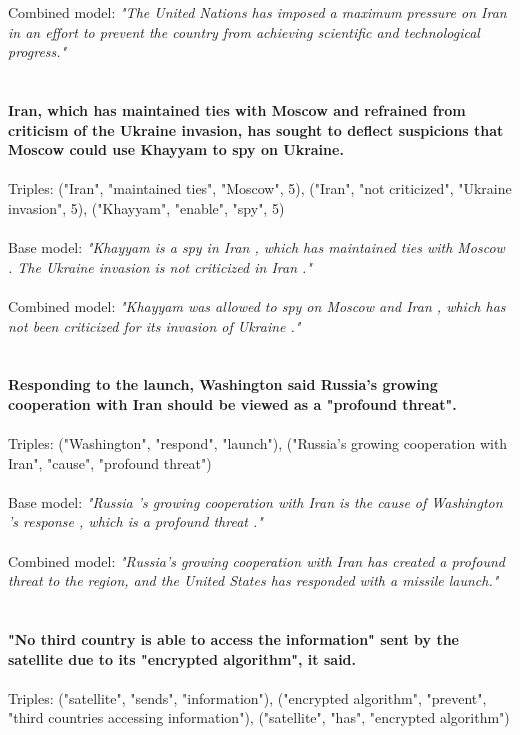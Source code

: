 \documentclass[
hf, %
]{ceurart}
\begin{document}
\noindent
Combined model: \textit{"The United Nations has imposed a maximum pressure on Iran in an effort to prevent the country from achieving scientific and technological progress."}\\\\\\
\noindent
\textbf{Iran, which has maintained ties with Moscow and refrained from criticism of the Ukraine invasion, has sought to deflect suspicions that Moscow could use Khayyam to spy on Ukraine.}\\\\
\noindent
Triples: ("Iran", "maintained ties", "Moscow", 5), ("Iran", "not criticized", "Ukraine invasion", 5), ("Khayyam", "enable", "spy", 5)\\\\
\noindent
Base model: \textit{"Khayyam is a spy in Iran , which has maintained ties with Moscow . The Ukraine invasion is not criticized in Iran ."}\\\\
\noindent
Combined model: \textit{"Khayyam was allowed to spy on Moscow and Iran , which has not been criticized for its invasion of Ukraine ."}\\\\\\
\noindent
\textbf{Responding to the launch, Washington said Russia's growing cooperation with Iran should be viewed as a "profound threat".}\\\\
\noindent
Triples: ("Washington", "respond", "launch"), ("Russia's growing cooperation with Iran", "cause", "profound threat")\\\\
\noindent
Base model: \textit{"Russia 's growing cooperation with Iran is the cause of Washington 's response , which is a profound threat ."}\\\\
\noindent
Combined model: \textit{"Russia's growing cooperation with Iran has created a profound threat to the region, and the United States has responded with a missile launch."}\\\\\\
\noindent
\textbf{"No third country is able to access the information" sent by the satellite due to its "encrypted algorithm", it said.}\\\\
\noindent
Triples: ("satellite", "sends", "information"), ("encrypted algorithm", "prevent", "third countries accessing information"), ("satellite", "has", "encrypted algorithm")\\\\
\end{document}
